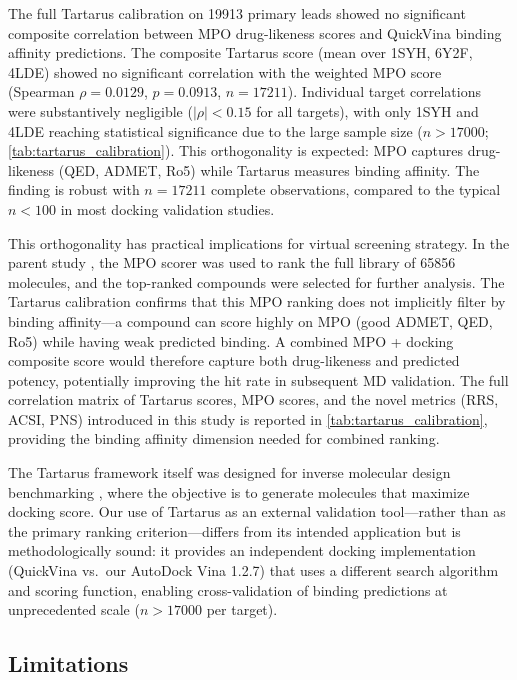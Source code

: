 \documentclass[11pt,a4paper]{article}
\begin{document}
The full Tartarus calibration on \num{19913} primary leads showed no significant composite correlation between MPO drug-likeness scores and QuickVina binding affinity predictions. The composite Tartarus score (mean over 1SYH, 6Y2F, 4LDE) showed no significant correlation with the weighted MPO score (Spearman $\rho = \num{0.0129}$, $p = \num{0.0913}$, $n = \num{17211}$). Individual target correlations were substantively negligible ($|\rho| < 0.15$ for all targets), with only 1SYH and 4LDE reaching statistical significance due to the large sample size ($n > \num{17000}$; \cref{tab:tartarus_calibration}). This orthogonality is expected: MPO captures drug-likeness (QED, ADMET, Ro5) while Tartarus measures binding affinity. The finding is robust with $n = \num{17211}$ complete observations, compared to the typical $n < 100$ in most docking validation studies.

This orthogonality has practical implications for virtual screening strategy. In the parent study \citep{temgoua2026antimalarial}, the MPO scorer was used to rank the full library of \num{65856} molecules, and the top-ranked compounds were selected for further analysis. The Tartarus calibration confirms that this MPO ranking does not implicitly filter by binding affinity---a compound can score highly on MPO (good ADMET, QED, Ro5) while having weak predicted binding. A combined MPO + docking composite score would therefore capture both drug-likeness and predicted potency, potentially improving the hit rate in subsequent MD validation. The full correlation matrix of Tartarus scores, MPO scores, and the novel metrics (RRS, ACSI, PNS) introduced in this study is reported in \cref{tab:tartarus_calibration}, providing the binding affinity dimension needed for combined ranking.

The Tartarus framework itself was designed for inverse molecular design benchmarking \citep{tartarus_2024}, where the objective is to generate molecules that maximize docking score. Our use of Tartarus as an external validation tool---rather than as the primary ranking criterion---differs from its intended application but is methodologically sound: it provides an independent docking implementation (QuickVina vs.\ our AutoDock Vina 1.2.7) that uses a different search algorithm and scoring function, enabling cross-validation of binding predictions at unprecedented scale ($n > \num{17000}$ per target).

\subsection{Limitations}
\end{document}
